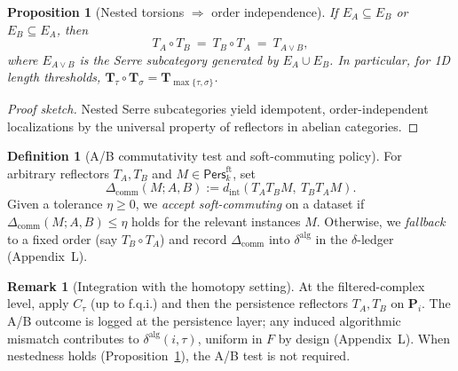 \documentclass[11pt]{article}
\DeclareRobustCommand{\hyp}{\nobreakdash-}
\newcommand{\Pers}{\mathsf{Pers}}
\numberwithin{equation}{section}
\newtheorem{proposition}[theorem]{Proposition}
\theoremstyle{definition}
\newtheorem{definition}[theorem]{Definition}
\newtheorem{remark}[theorem]{Remark}
\begin{document}
\begin{proposition}[Nested torsions \(\Rightarrow\) order independence]\label{B:prop:nested}
If \(E_A\subseteq E_B\) or \(E_B\subseteq E_A\), then
\[
T_A\circ T_B\ =\ T_B\circ T_A\ =\ T_{A\vee B},
\]
where \(E_{A\vee B}\) is the Serre subcategory generated by \(E_A\cup E_B\).
In particular, for 1D length thresholds, \(\mathbf{T}_\tau\circ \mathbf{T}_\sigma=\mathbf{T}_{\max\{\tau,\sigma\}}\).
\end{proposition}

\begin{proof}[Proof sketch]
Nested Serre subcategories yield idempotent, order\hyp independent localizations by the universal property of reflectors in abelian categories.
\end{proof}

\begin{definition}[A/B commutativity test and soft\hyp commuting policy]\label{B:def:ab}
For arbitrary reflectors \(T_A,T_B\) and \(M\in\Pers^{\mathrm{ft}}_k\), set
\[
\Delta_{\mathrm{comm}}(M;A,B):=d_{\mathrm{int}}(T_A T_B M,\ T_B T_A M).
\]
Given a tolerance \(\eta\ge 0\), we \emph{accept soft\hyp commuting} on a dataset if \(\Delta_{\mathrm{comm}}(M;A,B)\le \eta\) holds for the relevant instances \(M\). Otherwise, we \emph{fallback} to a fixed order (say \(T_B\circ T_A\)) and record \(\Delta_{\mathrm{comm}}\) into \(\delta^{\mathrm{alg}}\) in the \(\delta\)\hyp ledger (Appendix~L).
\end{definition}

\begin{remark}[Integration with the homotopy setting]
At the filtered\hyp complex level, apply \(C_\tau\) (up to f.q.i.) and then the persistence reflectors \(T_A,T_B\) on \(\mathbf{P}_i\). The A/B outcome is logged at the persistence layer; any induced algorithmic mismatch contributes to \(\delta^{\mathrm{alg}}(i,\tau)\), uniform in \(F\) by design (Appendix~L). When nestedness holds (Proposition~\ref{B:prop:nested}), the A/B test is not required.
\end{remark}

\end{document}
